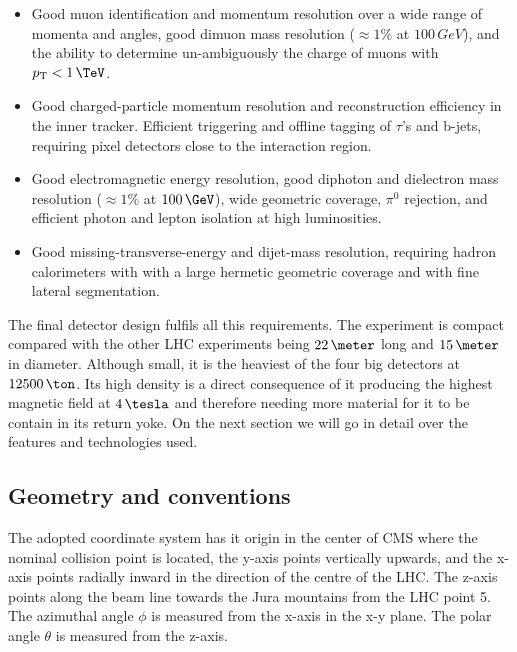 \begin{itemize}
  \item Good muon identification and momentum resolution over a wide range of momenta and angles, good dimuon mass resolution ($\approx 1\%$ at $100\,GeV$), and the ability to determine un-ambiguously the charge of muons with $\pt<1\,\TeV$.
  \item Good charged-particle momentum resolution and reconstruction efficiency in the inner tracker. Efficient triggering and offline tagging of $\tau$'s and b-jets, requiring pixel detectors close to the interaction region.
  \item Good electromagnetic energy resolution, good diphoton and dielectron mass resolution ($\approx 1\%$ at $100\,\GeV$), wide geometric coverage, $\pi^0$ rejection, and efficient photon and lepton isolation at high luminosities.
  \item Good missing-transverse-energy and dijet-mass resolution, requiring hadron calorimeters with with a large hermetic geometric coverage and with fine lateral segmentation.
\end{itemize}

The final detector design fulfils all this requirements. The experiment is compact compared with the other \gls{LHC} experiments being $22\,\meter$ long and $15\,\meter$ in diameter. Although small, it is the heaviest of the four big detectors at $12500\,\ton$. Its high density is a direct consequence of it producing the highest magnetic field at $4\,\tesla$ and therefore needing more material for it to be contain in its return yoke. On the next section we will go in detail over the features and technologies used.

\subsection{Geometry and conventions}
\label{SECTION:ExperimentalApparatus_CMS_GeometryConventions}


The adopted coordinate system has it origin in the center of \gls{CMS} where the nominal collision point is located, the y-axis points vertically upwards, and the x-axis points radially inward in the direction of the centre of the \gls{LHC}. The z-axis points along the beam line towards the Jura mountains from the \gls{LHC} point 5. The azimuthal angle $\phi$ is measured from the x-axis in the x-y plane. The polar angle $\theta$ is measured from the z-axis.

